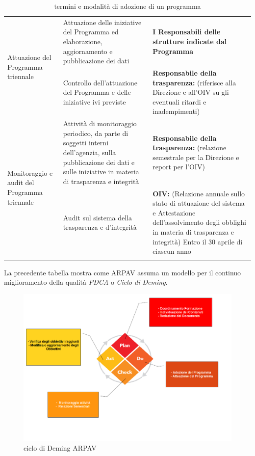 \begin{longtable}{p{}|p{}|p{}}
\multirow{2}{0.2\textwidth}{ \vfill Attuazione del Programma triennale} & Attuazione delle iniziative del Programma ed elaborazione, aggiornamento e pubblicazione dei dati & \textbf{{\color{Plum}I Responsabili delle strutture indicate dal Programma}} \\ \cline{2-3}
 & Controllo dell'attuazione del Programma e delle iniziative ivi previste & \textbf{{\color{Plum}Responsabile della trasparenza}:} (riferisce alla Direzione e all'OIV su gli eventuali ritardi e inadempimenti) \\ 

\midrule

\multirow{2}{0.2\textwidth}{\vfill Monitoraggio e audit del Programma triennale} 
& Attività di monitoraggio periodico, da parte di soggetti interni dell'agenzia, sulla pubblicazione dei dati e sulle iniziative in materia di trasparenza e integrità
& \textbf{{\color{Plum}Responsabile della trasparenza}:} (relazione semestrale per la Direzione e report per l'OIV) \\ \cline{2-3}
 & Audit sul sistema della trasparenza e d'integrità 
  & \textbf{{\color{Plum}OIV}:} (Relazione annuale sullo stato di attuazione del sistema e Attestazione dell'assolvimento degli obblighi in materia di trasparenza e integrità)
Entro il 30 aprile di ciascun anno \\
\bottomrule
\caption{termini e modalità di adozione di un programma}
\end{longtable}

La precedente tabella mostra come ARPAV assuma un modello per il continuo miglioramento della qualità \textit{PDCA} o \textit{Ciclo di Deming}.

\begin{figure}[htpb]


\includegraphics[scale=0.5]{./capitoli/capitolo1/img/demming}
\caption{ciclo di Deming ARPAV}
\end{figure}

